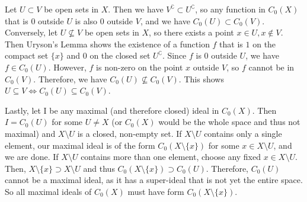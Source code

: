 \documentclass[a4paper]{article}
\begin{document}
Let $U \subset V$ be open sets in $X$.
Then we have $V^\complement \subset U^\complement$, so any function in $C_0(X)$ that is $0$ outside $U$ is also $0$ outside $V$, and we have $C_0(U) \subset C_0(V)$.
Conversely, let $U \nsubseteq V$ be open sets in $X$, so there exists a point $x \in U, x \notin V$.
Then Uryson's Lemma shows the existence of a function $f$ that is $1$ on the compact set $\{x\}$ and $0$ on the closed set $U^\complement$.
Since $f$ is $0$ outside $U$, we have $f \in C_0(U)$.
However, $f$ is non-zero on the point $x$ outside $V$, so $f$ cannot be in $C_0(V)$.
Therefore, we have $C_0(U) \nsubseteq C_0(V)$.
This shows $U \subseteq V \iff C_0(U) \subseteq C_0(V)$.

Lastly, let I be any maximal (and therefore closed) ideal in $C_0(X)$.
Then $I = C_0(U)$ for some $U \neq X$ (or $C_0(X)$ would be the whole space and thus not maximal) and $X \setminus U$ is a closed, non-empty set.
If $X \setminus U$ contains only a single element, our maximal ideal is of the form $C_0(X \setminus \{x\})$ for some $x \in X \setminus U$, and we are done.
If $X \setminus U$ contains more than one element, choose any fixed $x \in X \setminus U$.
Then, $X \setminus \{x\} \supset X \setminus U$ and thus $C_0(X\setminus\{x\}) \supset C_0(U)$.
Therefore, $C_0(U)$ cannot be a maximal ideal, as it has a super-ideal that is not yet the entire space.
So all maximal ideals of $C_0(X)$ must have form $C_0(X\setminus\{x\})$.
\end{document}

